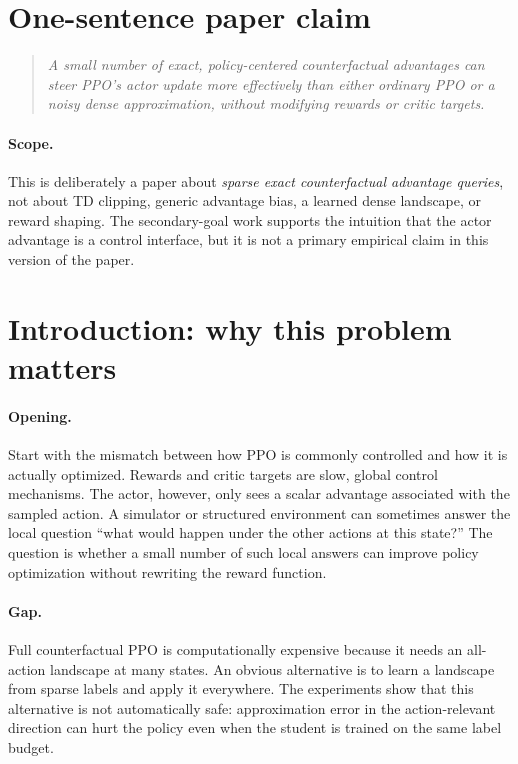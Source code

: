 \documentclass[11pt]{article}
\begin{document}
\section*{One-sentence paper claim}
\begin{quote}
\emph{A small number of exact, policy-centered counterfactual advantages can
steer PPO's actor update more effectively than either ordinary PPO or a noisy
dense approximation, without modifying rewards or critic targets.}
\end{quote}

\paragraph{Scope.}
This is deliberately a paper about \emph{sparse exact counterfactual advantage
queries}, not about TD clipping, generic advantage bias, a learned dense
landscape, or reward shaping. The secondary-goal work supports the intuition
that the actor advantage is a control interface, but it is not a primary
empirical claim in this version of the paper.

\section{Introduction: why this problem matters}
\label{sec:intro}

\paragraph{Opening.}
Start with the mismatch between how PPO is commonly controlled and how it is
actually optimized. Rewards and critic targets are slow, global control
mechanisms. The actor, however, only sees a scalar advantage associated with
the sampled action. A simulator or structured environment can sometimes answer
the local question ``what would happen under the other actions at this state?''
The question is whether a small number of such local answers can improve policy
optimization without rewriting the reward function.

\paragraph{Gap.}
Full counterfactual PPO is computationally expensive because it needs an
all-action landscape at many states. An obvious alternative is to learn a
landscape from sparse labels and apply it everywhere. The experiments show that
this alternative is not automatically safe: approximation error in the
action-relevant direction can hurt the policy even when the student is trained
on the same label budget.
\end{document}
